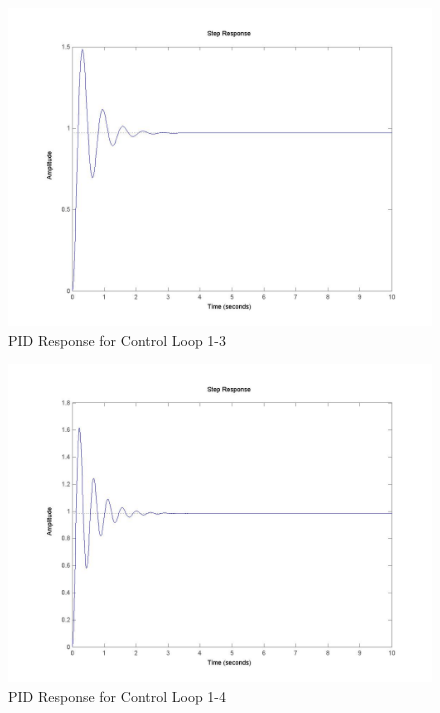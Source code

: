 	\begin{figure}[H]
		\includegraphics[width=\textwidth]{part1-3.jpg}
		\caption{PID Response for Control Loop 1-3}
	\end{figure}
	
	\begin{figure}[H]
		\includegraphics[width=\textwidth]{part1-4.jpg}
		\caption{PID Response for Control Loop 1-4}
	\end{figure}
	
